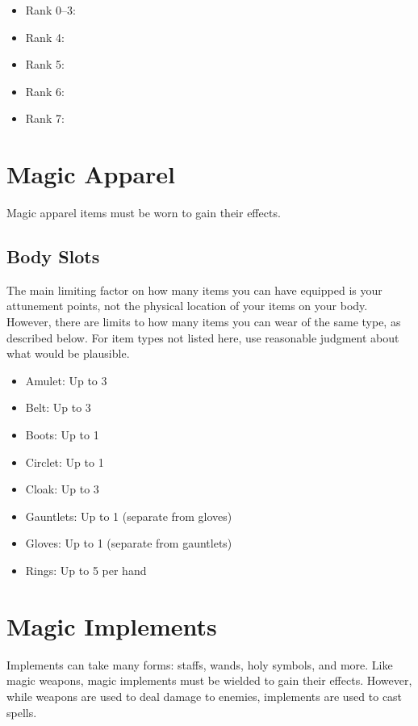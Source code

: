         \begin{itemize}
            \item Rank 0--3: 
            \item Rank 4: 
            \item Rank 5: 
            \item Rank 6: 
            \item Rank 7: 
        \end{itemize}


    

    

\newpage
\section{Magic Apparel}
    Magic apparel items must be worn to gain their effects.

    \subsection{Body Slots}
        The main limiting factor on how many items you can have equipped is your attunement points, not the physical location of your items on your body.
        However, there are limits to how many items you can wear of the same type, as described below.
        For item types not listed here, use reasonable judgment about what would be plausible.
        \begin{itemize}
            \item Amulet: Up to 3
            \item Belt: Up to 3
            \item Boots: Up to 1
            \item Circlet: Up to 1
            \item Cloak: Up to 3
            \item Gauntlets: Up to 1 (separate from gloves)
            \item Gloves: Up to 1 (separate from gauntlets)
            \item Rings: Up to 5 per hand
        \end{itemize}

    

    

\newpage
\section{Magic Implements}\label{Implements}
    Implements can take many forms: staffs, wands, holy symbols, and more.
    Like magic weapons, magic implements must be wielded to gain their effects.
    However, while weapons are used to deal damage to enemies, implements are used to cast spells.

